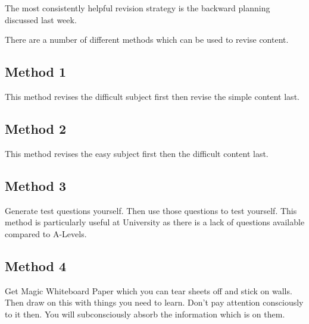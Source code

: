 The most consistently helpful revision strategy is the backward planning discussed last week.

There are a number of different methods which can be used to revise content. 
\subsection*{Method 1}
This method revises the difficult subject first then revise the simple content last. 
\subsection*{Method 2}
This method revises the easy subject first then the difficult content last.
\subsection*{Method 3}
Generate test questions yourself. Then use those questions to test yourself. This method is particularly useful at University as there is a lack of questions available compared to A-Levels. 
\subsection*{Method 4}
Get Magic Whiteboard Paper which you can tear sheets off and stick on walls. Then draw on this with things you need to learn. Don't pay attention consciously to it then. You will subconsciously absorb the information which is on them. 
